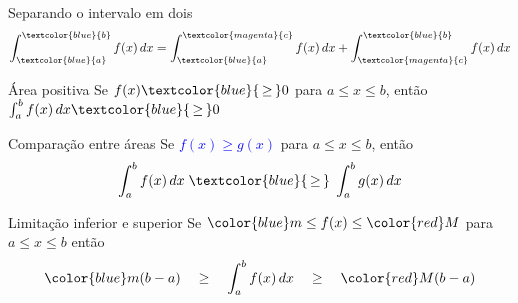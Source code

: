 \begin{frame}{Separando o intervalo em dois}
  \Large
  \[
    \int_{\textcolor{blue}{a}}^{\textcolor{blue}{b}} f(x)\,dx
    = \int_{\textcolor{blue}{a}}^{\textcolor{magenta}{c}} f(x)\,dx
    + \int_{\textcolor{magenta}{c}}^{\textcolor{blue}{b}} f(x)\,dx
  \]
\end{frame}

\begin{frame}{Área positiva}
  \Large
  Se \(f(x)\textcolor{blue}{\,\geq\,} 0\) para \(a \leq x \leq b\), então
  \(
    \int_{a}^b f(x)\,dx \textcolor{blue}{\,\geq\,} 0
  \)
\end{frame}

\begin{frame}{Comparação entre áreas}
  \Large
  Se \textcolor{blue}{$f(x) \geq g(x)$}
  para $a \leq x \leq b$, então \\[9mm]
  \[
    \int_{a}^b f(x)\,dx \;\textcolor{blue}{\,\geq\,}\; \int_{a}^b g(x)\,dx
  \]
\end{frame}

\begin{frame}{Limitação inferior e superior}
  \Large
  Se {${\color{blue}m} \leq f(x) \leq {\color{red}M}$} para $a \leq x \leq b$ então \\[9mm]
  \[
    {\color{blue} m}(b-a)                 \quad\geq\quad
    \int_{a}^b f(x)\,dx    \quad\geq\quad
    {\color{red} M}(b-a)
  \]
\end{frame}

\begin{frame}
  \tableofcontents
\end{frame}


